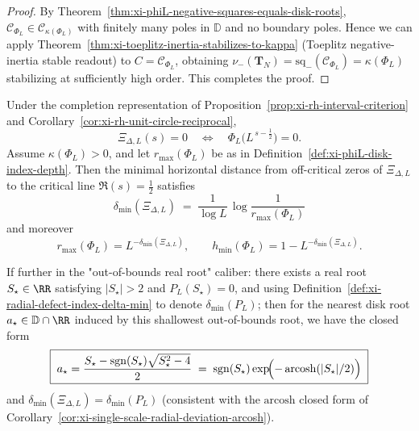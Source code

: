 \begin{proof}
By Theorem~\ref{thm:xi-phiL-negative-squares-equals-disk-roots}, \(\mathscr{C}_{\Phi_L}\in\mathcal{C}_{\kappa(\Phi_L)}\) with finitely many poles in \(\mathbb{D}\) and no boundary poles.
Hence we can apply Theorem~\ref{thm:xi-toeplitz-inertia-stabilizes-to-kappa} (Toeplitz negative-inertia stable readout) to \(C=\mathscr{C}_{\Phi_L}\), obtaining \(\nu_-(\mathbf{T}_N)=\mathrm{sq}_-(\mathscr{C}_{\Phi_L})=\kappa(\Phi_L)\) stabilizing at sufficiently high order. This completes the proof.
\end{proof}

\begin{proposition}\label{prop:xi-phiL-depth-delta-min-alignment}
Under the completion representation of Proposition~\ref{prop:xi-rh-interval-criterion} and Corollary~\ref{cor:xi-rh-unit-circle-reciprocal},
\[
\Xi_{\Delta,L}(s)=0
\quad\Longleftrightarrow\quad
\Phi_L\!\bigl(L^{\,s-\frac12}\bigr)=0.
\]
Assume \(\kappa(\Phi_L)>0\), and let \(r_{\max}(\Phi_L)\) be as in Definition~\ref{def:xi-phiL-disk-index-depth}.
Then the minimal horizontal distance from off-critical zeros of \(\Xi_{\Delta,L}\) to the critical line \(\Re(s)=\tfrac12\) satisfies
\[
\boxed{\;
\delta_{\min}(\Xi_{\Delta,L})
\;=\;
\frac{1}{\log L}\,\log\frac{1}{r_{\max}(\Phi_L)}\;}
\]
and moreover
\[
\boxed{\;
r_{\max}(\Phi_L)=L^{-\delta_{\min}(\Xi_{\Delta,L})},
\qquad
h_{\min}(\Phi_L)=1-L^{-\delta_{\min}(\Xi_{\Delta,L})}.\;}
\]
\par
If further in the "out-of-bounds real root" caliber: there exists a real root \(S_\star\in\RR\) satisfying \(|S_\star|>2\) and \(P_L(S_\star)=0\), and using Definition~\ref{def:xi-radial-defect-index-delta-min} to denote
\(
\delta_{\min}(P_L)
\);
then for the nearest disk root \(a_\star\in\mathbb{D}\cap\RR\) induced by this shallowest out-of-bounds root, we have the closed form
\[
\boxed{\;
a_\star=\frac{S_\star-\operatorname{sgn}(S_\star)\sqrt{S_\star^{2}-4}}{2}
\;=\;
\operatorname{sgn}(S_\star)\exp\!\Bigl(-\operatorname{arcosh}(|S_\star|/2)\Bigr)\;}
\]
and
\(
\delta_{\min}(\Xi_{\Delta,L})=\delta_{\min}(P_L)
\)
(consistent with the \(\mathrm{arcosh}\) closed form of Corollary~\ref{cor:xi-single-scale-radial-deviation-arcosh}).
\end{proposition}

